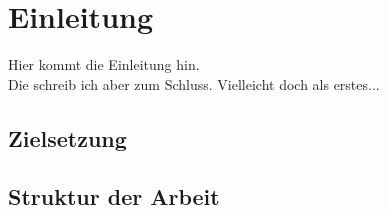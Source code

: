 \section{Einleitung}
\noindent
Hier kommt die Einleitung hin. \\
Die schreib ich aber zum Schluss. \newline
Vielleicht doch als erstes...

\subsection{Zielsetzung}
\subsection{Struktur der Arbeit}


\newpage
